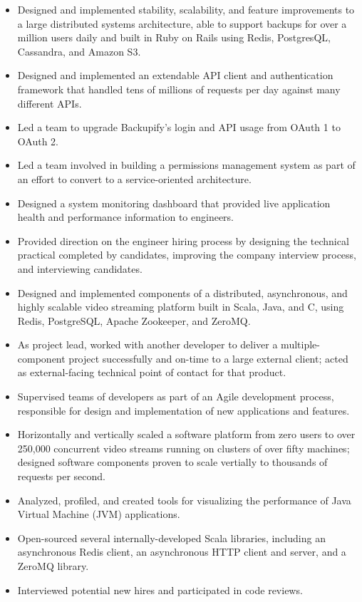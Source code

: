 \documentclass[11pt,a4paper,sans]{moderncv}
\begin{document}
{ \begin{itemize} \itemsep -1pt
  \item Designed and implemented stability, scalability, and feature improvements to a large distributed systems architecture, able to support backups for over a million users daily and built in Ruby on Rails using Redis, PostgresQL, Cassandra, and Amazon S3.\item Designed and implemented an extendable API client and authentication framework that handled tens of millions of requests per day against many different APIs.\item Led a team to upgrade Backupify's login and API usage from OAuth 1 to OAuth 2.\item Led a team involved in building a permissions management system as part of an effort to convert to a service-oriented architecture.\item Designed a system monitoring dashboard that provided live application health and performance information to engineers.\item Provided direction on the engineer hiring process by designing the technical practical completed by candidates, improving the company interview process, and interviewing candidates.
\end{itemize} }
  
{ \begin{itemize} \itemsep -1pt
  \item Designed and implemented components of a distributed, asynchronous, and highly scalable video streaming platform built in Scala, Java, and C, using Redis, PostgreSQL, Apache Zookeeper, and ZeroMQ.\item As project lead, worked with another developer to deliver a multiple-component project successfully and on-time to a large external client; acted as external-facing technical point of contact for that product.\item Supervised teams of developers as part of an Agile development process, responsible for design and implementation of new applications and features.\item Horizontally and vertically scaled a software platform from zero users to over 250,000 concurrent video streams running on clusters of over fifty machines; designed software components proven to scale vertially to thousands of requests per second.\item Analyzed, profiled, and created tools for visualizing the performance of Java Virtual Machine (JVM) applications.\item Open-sourced several internally-developed Scala libraries, including an asynchronous Redis client, an asynchronous HTTP client and server, and a ZeroMQ library.\item Interviewed potential new hires and participated in code reviews.
\end{itemize} }
  
\end{document}
